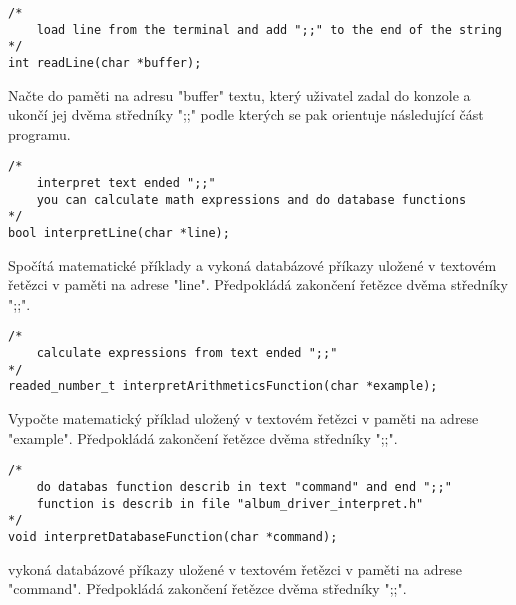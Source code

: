 \begin{lstlisting}[style=CStyle]
/*
    load line from the terminal and add ";;" to the end of the string
*/
int readLine(char *buffer);
\end{lstlisting}
Načte do paměti na adresu "buffer" textu, který uživatel zadal do konzole a ukončí jej dvěma středníky ";;" podle kterých se pak orientuje následující část programu. 

\begin{lstlisting}[style=CStyle]
/*
    interpret text ended ";;"
    you can calculate math expressions and do database functions
*/
bool interpretLine(char *line);
\end{lstlisting}
Spočítá matematické příklady a vykoná databázové příkazy uložené v textovém řetězci v paměti na adrese "line".
Předpokládá zakončení řetězce dvěma středníky ";;".

\begin{lstlisting}[style=CStyle]
/*
    calculate expressions from text ended ";;"
*/
readed_number_t interpretArithmeticsFunction(char *example);
\end{lstlisting}
Vypočte matematický příklad uložený v textovém řetězci v paměti na adrese "example".
Předpokládá zakončení řetězce dvěma středníky ";;".

\begin{lstlisting}[style=CStyle]
/*
    do databas function describ in text "command" and end ";;"
    function is describ in file "album_driver_interpret.h"
*/
void interpretDatabaseFunction(char *command);
\end{lstlisting}
vykoná databázové příkazy uložené v textovém řetězci v paměti na adrese "command".
Předpokládá zakončení řetězce dvěma středníky ";;".